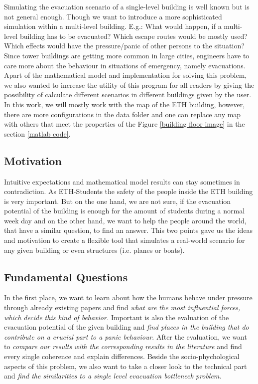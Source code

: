 \documentclass[11pt]{article}
\begin{document}
Simulating the evacuation scenario of a single-level building is well known but
is not general enough. Though we want to introduce a more sophisticated
simulation within a multi-level building. E.g.: What would happen, if a
multi-level building has to be evacuated? Which escape routes would be mostly
used? Which effects would have the pressure/panic of other persons to the
situation? Since tower buildings are getting more common in large cities,
engineers have to care more about the behaviour in situations of emergency,
namely evacuations. Apart of the mathematical model and implementation for
solving this problem, we also wanted to increase the utility of this program for
all readers by giving the possibility of calculate different scenarios in
different buildings given by the user. In this work, we will mostly work with
the map of the ETH building, however, there are more configurations in the data
folder and one can replace any map with others that meet the properties of the
Figure \ref{building floor image} in the section \ref{matlab code}.

\subsection{Motivation}

Intuitive expectations and mathematical model results can stay sometimes in
contradiction. As ETH-Students the safety of the people inside the ETH building
is very important. But on the one hand, we are not sure, if the evacuation
potential of the building is enough for the amount of students during a normal
week day and on the other hand, we want to help the people around the world,
that have a similar question, to find an answer. This two points gave us the
ideas and motivation to create a flexible tool that simulates a real-world
scenario for any given building or even structures (i.e. planes or boats).


\subsection{Fundamental Questions}

In the first place, we want to learn about how the humans behave under pressure
through already existing papers \cite{AACIBF} \cite{ACPPD}  \cite{SDFEP}
\cite{DCD} and find \textit{ what are the most influential forces, which decide
this kind of behavior.} Important is also the evaluation of the evacuation
potential of the given building and \textit{find places in the building that do
contribute on a crucial part to a panic behaviour}.  After the evaluation, we
want to \textit{compare our results with the corresponding results in the
literature} and find every single coherence and explain differences. Beside the
socio-phychological aspects of this problem, we also want to take a closer look
to the technical part and \textit{find the similarities to a single level
evacuation bottleneck problem}.
\end{document}
